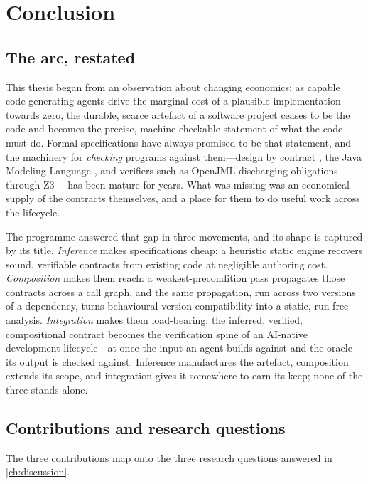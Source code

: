 \chapter{Conclusion}\label{ch:conclusion}

\section{The arc, restated}\label{sec:conc-arc}

This thesis began from an observation about changing economics: as capable
code-generating agents drive the marginal cost of a plausible implementation
towards zero, the durable, scarce artefact of a software project ceases to be the
code and becomes the precise, machine-checkable statement of what the code must
do. Formal specifications have always promised to be that statement, and the
machinery for \emph{checking} programs against them---design by contract
\citep{meyer1992dbc}, the Java Modeling Language \citep{leavens2006jml}, and
verifiers such as OpenJML \citep{cok2014openjml} discharging obligations through
Z3 \citep{demoura2008z3}---has been mature for years. What was missing was an
economical supply of the contracts themselves, and a place for them to do useful
work across the lifecycle.

The programme answered that gap in three movements, and its shape is captured by
its title. \emph{Inference} makes specifications cheap: a heuristic static engine
recovers sound, verifiable contracts from existing code at negligible authoring
cost. \emph{Composition} makes them reach: a weakest-precondition pass propagates
those contracts across a call graph, and the same propagation, run across two
versions of a dependency, turns behavioural version compatibility into a static,
run-free analysis. \emph{Integration} makes them load-bearing: the inferred,
verified, compositional contract becomes the verification spine of an AI-native
development lifecycle---at once the input an agent builds against and the oracle
its output is checked against. Inference manufactures the artefact, composition
extends its scope, and integration gives it somewhere to earn its keep; none of
the three stands alone.

\section{Contributions and research questions}\label{sec:conc-contributions}

The three contributions map onto the three research questions answered in
\cref{ch:discussion}.

